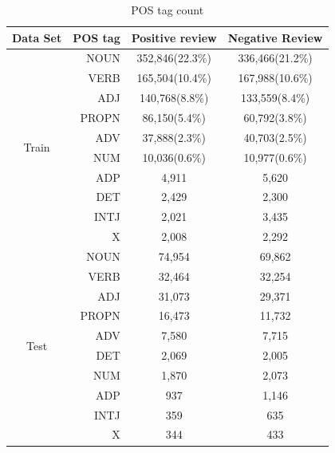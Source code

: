 \documentclass[12pt]{article}
\begin{document}
\begin{table}[!h]
\begin{center}
\fontsize{9pt}{9pt}\selectfont
\begin{tabular}{|c|r|c|c|}
\hline
\multicolumn{1}{|l|}{Data Set} & POS tag & Positive review & Negative Review \\ \hline
\multirow{10}{*}{Train}        & NOUN    & 352,846(22.3\%) & 336,466(21.2\%) \\ \cline{2-4} 
                               & VERB    & 165,504(10.4\%)& 167,988(10.6\%) \\ \cline{2-4} 
                               & ADJ     & 140,768(8.8\%) & 133,559(8.4\%)  \\ \cline{2-4} 
                               & PROPN   & 86,150(5.4\%)   & 60,792(3.8\%)  \\ \cline{2-4} 
                               & ADV     & 37,888(2.3\%)   & 40,703(2.5\%)  \\ \cline{2-4} 
                               & NUM     & 10,036(0.6\%)   & 10,977(0.6\%)  \\ \cline{2-4} 
                               & ADP     & 4,911           & 5,620           \\ \cline{2-4} 
                               & DET     & 2,429           & 2,300           \\ \cline{2-4} 
                               & INTJ    & 2,021           & 3,435           \\ \cline{2-4} 
                               & X       & 2,008           & 2,292           \\ \hline
\multirow{10}{*}{Test}         & NOUN    & 74,954          & 69,862          \\ \cline{2-4} 
                               & VERB    & 32,464          & 32,254          \\ \cline{2-4} 
                               & ADJ     & 31,073          & 29,371          \\ \cline{2-4} 
                               & PROPN   & 16,473          & 11,732          \\ \cline{2-4} 
                               & ADV     & 7,580           & 7,715           \\ \cline{2-4} 
                               & DET     & 2,069           & 2,005           \\ \cline{2-4} 
                               & NUM     & 1,870           & 2,073           \\ \cline{2-4} 
                               & ADP     & 937             & 1,146           \\ \cline{2-4} 
                               & INTJ    & 359             & 635             \\ \cline{2-4} 
                               & X       & 344             & 433             \\ \hline
\end{tabular}
     \caption{POS tag count}
    \label{tab:poscount}
\end{center}
\end{table}
\end{document}
